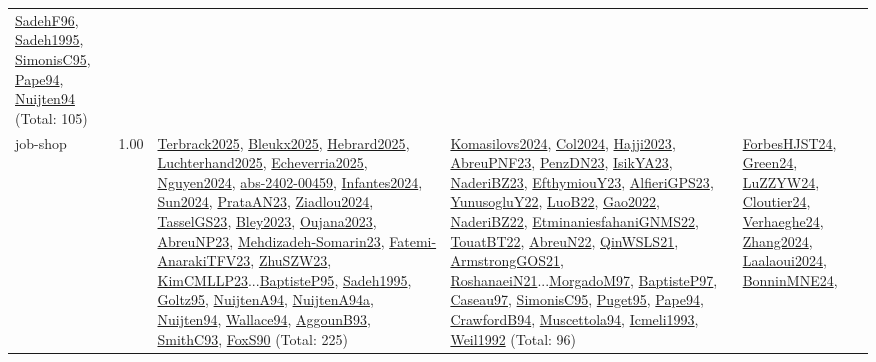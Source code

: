{\begin{longtable}{p{3cm}r>{\raggedright\arraybackslash}p{6cm}>{\raggedright\arraybackslash}p{6cm}>{\raggedright\arraybackslash}p{8cm}}
\hyperref[detail:SadehF96]{SadehF96}, \hyperref[detail:Sadeh1995]{Sadeh1995}, \hyperref[detail:SimonisC95]{SimonisC95}, \hyperref[detail:Pape94]{Pape94}, \hyperref[detail:Nuijten94]{Nuijten94} (Total: 105)\\
\index{job-shop}\index{Concepts!job-shop}job-shop &  1.00 & \hyperref[detail:Terbrack2025]{Terbrack2025}, \hyperref[detail:Bleukx2025]{Bleukx2025}, \hyperref[detail:Hebrard2025]{Hebrard2025}, \hyperref[detail:Luchterhand2025]{Luchterhand2025}, \hyperref[detail:Echeverria2025]{Echeverria2025}, \hyperref[detail:Nguyen2024]{Nguyen2024}, \hyperref[detail:abs-2402-00459]{abs-2402-00459}, \hyperref[detail:Infantes2024]{Infantes2024}, \hyperref[detail:Sun2024]{Sun2024}, \hyperref[detail:PrataAN23]{PrataAN23}, \hyperref[detail:Ziadlou2024]{Ziadlou2024}, \hyperref[detail:TasselGS23]{TasselGS23}, \hyperref[detail:Bley2023]{Bley2023}, \hyperref[detail:Oujana2023]{Oujana2023}, \hyperref[detail:AbreuNP23]{AbreuNP23}, \hyperref[detail:Mehdizadeh-Somarin23]{Mehdizadeh-Somarin23}, \hyperref[detail:Fatemi-AnarakiTFV23]{Fatemi-AnarakiTFV23}, \hyperref[detail:ZhuSZW23]{ZhuSZW23}, \hyperref[detail:KimCMLLP23]{KimCMLLP23}...\hyperref[detail:BaptisteP95]{BaptisteP95}, \hyperref[detail:Sadeh1995]{Sadeh1995}, \hyperref[detail:Goltz95]{Goltz95}, \hyperref[detail:NuijtenA94]{NuijtenA94}, \hyperref[detail:NuijtenA94a]{NuijtenA94a}, \hyperref[detail:Nuijten94]{Nuijten94}, \hyperref[detail:Wallace94]{Wallace94}, \hyperref[detail:AggounB93]{AggounB93}, \hyperref[detail:SmithC93]{SmithC93}, \hyperref[detail:FoxS90]{FoxS90} (Total: 225) & \hyperref[detail:Komasilovs2024]{Komasilovs2024}, \hyperref[detail:Col2024]{Col2024}, \hyperref[detail:Hajji2023]{Hajji2023}, \hyperref[detail:AbreuPNF23]{AbreuPNF23}, \hyperref[detail:PenzDN23]{PenzDN23}, \hyperref[detail:IsikYA23]{IsikYA23}, \hyperref[detail:NaderiBZ23]{NaderiBZ23}, \hyperref[detail:EfthymiouY23]{EfthymiouY23}, \hyperref[detail:AlfieriGPS23]{AlfieriGPS23}, \hyperref[detail:YunusogluY22]{YunusogluY22}, \hyperref[detail:LuoB22]{LuoB22}, \hyperref[detail:Gao2022]{Gao2022}, \hyperref[detail:NaderiBZ22]{NaderiBZ22}, \hyperref[detail:EtminaniesfahaniGNMS22]{EtminaniesfahaniGNMS22}, \hyperref[detail:TouatBT22]{TouatBT22}, \hyperref[detail:AbreuN22]{AbreuN22}, \hyperref[detail:QinWSLS21]{QinWSLS21}, \hyperref[detail:ArmstrongGOS21]{ArmstrongGOS21}, \hyperref[detail:RoshanaeiN21]{RoshanaeiN21}...\hyperref[detail:MorgadoM97]{MorgadoM97}, \hyperref[detail:BaptisteP97]{BaptisteP97}, \hyperref[detail:Caseau97]{Caseau97}, \hyperref[detail:SimonisC95]{SimonisC95}, \hyperref[detail:Puget95]{Puget95}, \hyperref[detail:Pape94]{Pape94}, \hyperref[detail:CrawfordB94]{CrawfordB94}, \hyperref[detail:Muscettola94]{Muscettola94}, \hyperref[detail:Icmeli1993]{Icmeli1993}, \hyperref[detail:Weil1992]{Weil1992} (Total: 96) & \hyperref[detail:ForbesHJST24]{ForbesHJST24}, \hyperref[detail:Green24]{Green24}, \hyperref[detail:LuZZYW24]{LuZZYW24}, \hyperref[detail:Cloutier24]{Cloutier24}, \hyperref[detail:Verhaeghe24]{Verhaeghe24}, \hyperref[detail:Zhang2024]{Zhang2024}, \hyperref[detail:Laalaoui2024]{Laalaoui2024}, \hyperref[detail:BonninMNE24]{BonninMNE24}, 
\end{longtable}}
